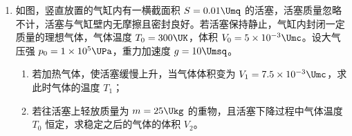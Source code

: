 \documentclass[\gkver]{gaokaozhenti}
\begin{document}
\begin{enumerate}
{\begin{enumerate}
	\item
	（如图）

	\item
	2.90，2.18

	\item
	小于，$r_{\text{测}} = \frac{(r_{\text{真}} + R_{0})R_{\mathrm{V}}}{r_{\text{真}} + R_{0} + R_{\mathrm{V}}}$
\end{enumerate}
}

\item
如图，竖直放置的气缸内有一横截面积 $S = 0.01 \Umq$ 的活塞，活塞质量忽略不计，活塞与气缸壁内无摩擦且密封良好。若活塞保持静止，气缸内封闭一定质量的理想气体，气体温度 $T_{0} = 300 \UK$，体积 $V_{0} = 5 \times 10^{-3} \Umc$。设大气压强 $p_{0} = 1 \times 10^{5} \UPa$，重力加速度 $g = 10 \Umsq$。

\begin{enumerate}
	\item
	若加热气体，使活塞缓慢上升，当气体体积变为 $V_{1} = 7.5 \times 10^{-3} \Umc$，求此时气体的温度 $T_{1}$；
	\item
	若往活塞上轻放质量为 $m = 25 \Ukg$ 的重物，且活塞下降过程中气体温度 $T_{0}$ 恒定，求稳定之后的气体的体积 $V_{2}$。
\end{enumerate}



\end{enumerate}
\end{document}
